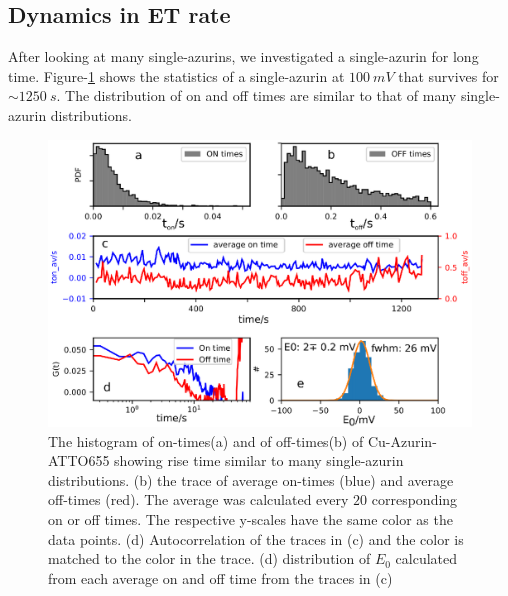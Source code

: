 \documentclass[journal=jacsat,manuscript=article]{achemso}
\begin{document}
\subsection{Dynamics in ET rate}
After looking at many single-azurins, we investigated a single-azurin for long time. Figure-\ref{fig:long_azurin_trace} shows the statistics of a single-azurin at $100~mV$ that survives for ${\sim}1250~s$. The distribution of on and off times are similar to that of many single-azurin distributions.
\begin{figure}
	\centering
	\includegraphics[width=\textwidth]{long_azurin_trace.eps}
	\caption{The histogram of on-times(a) and of off-times(b) of Cu-Azurin-ATTO655 showing rise time similar to many single-azurin distributions. (b) the trace of average on-times (blue) and average off-times (red). The average was calculated every $20$ corresponding on or off times. The respective y-scales have the same color as the data points. (d) Autocorrelation of the traces in (c) and the color is matched to the color in the trace. (d) distribution of $E_0$ calculated from each average on and off time from the traces in (c)}
	\label{fig:long_azurin_trace}
\end{figure}
\end{document}
